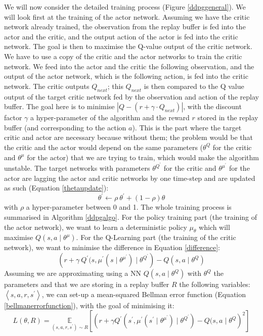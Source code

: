 We will now consider the detailed training process (Figure \ref{ddpggeneral}). We will look first at the training of the actor network. Assuming we have the critic network already trained, the observation from the replay buffer is fed into the actor and the critic, and the output action of the actor is fed into the critic network. The goal is then to maximise the Q-value output of the critic network. \newline
We have to use a copy of the critic and the actor networks to train the critic network. We feed into the actor and the critic the following observation, and the output of the actor network, which is the following action, is fed into the critic network. The critic outputs $Q_{next}$; this $Q_{next}$ is then compared to the Q value output of the target critic network fed by the observation and action of the replay buffer. The goal here is to minimise $ | Q - (r + \gamma \cdot Q_{next})|$, with the discount factor $ \gamma $ a hyper-parameter of the algorithm and the reward $r$ stored in the replay buffer (and corresponding to the action $a$). This is the part where the target critic and actor are necessary because without them; the problem would be that the critic and the actor would depend on the same parameters ($\theta^{Q}$ for the critic and $\theta^{\mu}$ for the actor) that we are trying to train, which would make the algorithm unstable. The target networks with parameters $\theta^{Q^{'}}$ for the critic and $\theta^{\mu^{'}}$ for the actor are lagging the actor and critic networks by one time-step and are updated as such (Equation \ref{thetaupdate}):
\begin{equation}
\label{thetaupdate}
	 \theta^{'} \leftarrow \rho \: \theta^{'} + (1- \rho)\theta
\end{equation}
with $\rho$ a hyper-parameter between 0 and 1. The whole training process is summarised in Algorithm \ref{ddpgalgo}. \newline
For the policy training part (the training of the actor network), we want to learn a deterministic policy $\mu_{\theta}$ which will maximise $Q(s,a\mid \theta^{\mu})$. For the Q-Learning part (the training of the critic network), we want to minimise the difference in Equation \ref{difference}:
\begin{equation}
\label{difference}
 \left(r + \gamma \: Q^{'}(s,\mu^{'}\left(s \mid \theta^{\mu^{'}}\right) \mid \theta^{Q^{'}}\right) - Q\left(s,a \mid \theta^{Q}\right)
\end{equation}
  Assuming we are approximating using a NN $ Q(s,a\mid \theta^{Q}) $ with $ \theta^{Q} $ the parameters and that we are storing in a replay buffer $R$ the following variables: $ \left< s,a,r,s^{'} \right>$, we can set-up a mean-squared Bellman error function (Equation \ref{bellmanerrorfunction}), with the goal of minimising it:
  \begin{equation}
  \label{bellmanerrorfunction}
  L(\theta,R) = \underset{(s,a,r,s^{'}) \sim R}{\mathbb{E}} \left[\left(r + \gamma Q^{'}\left(s^{'},\mu^{'}\left(s^{'}\mid \theta^{\mu^{'}}\right) \mid \theta^{Q^{'}} \right) - Q(s,a \mid \theta^{Q} \right)^{2}\right]  	
  \end{equation}

